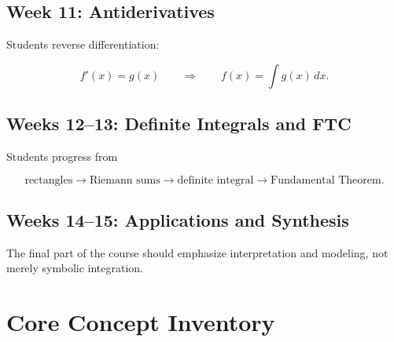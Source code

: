 \documentclass[11pt]{article}
\begin{document}
\subsection*{Week 11: Antiderivatives}

Students reverse differentiation:

\[
f'(x)=g(x)
\qquad\Longrightarrow\qquad
f(x)=\int g(x)\,dx.
\]

\subsection*{Weeks 12--13: Definite Integrals and FTC}

Students progress from

\[
\text{rectangles}
\rightarrow
\text{Riemann sums}
\rightarrow
\text{definite integral}
\rightarrow
\text{Fundamental Theorem}.
\]

\subsection*{Weeks 14--15: Applications and Synthesis}

The final part of the course should emphasize interpretation and modeling,
not merely symbolic integration.

\section{Core Concept Inventory}
\end{document}
